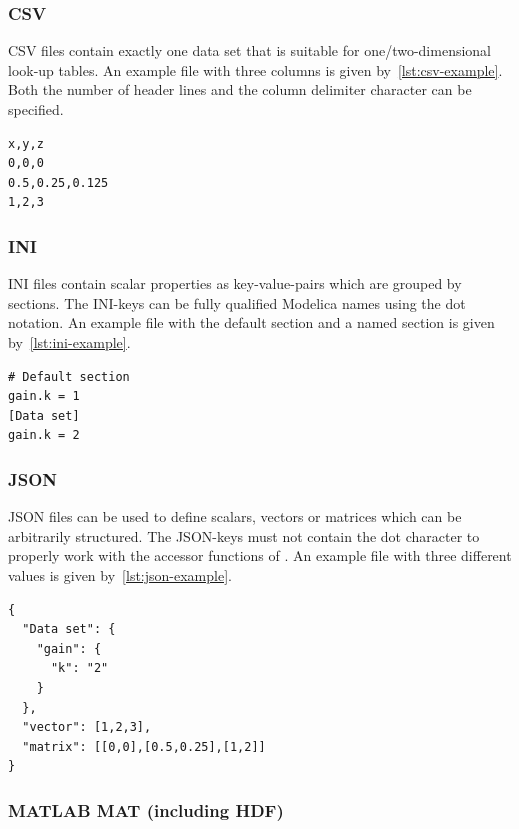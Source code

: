 \documentclass{modelica}
\newcommand{\modelica}[1]{\code{#1}}
\begin{document}
\subsubsection{CSV}

CSV files contain exactly one data set that is suitable for one/two-dimensional look-up tables.
An example file with three columns is given by~\autoref{lst:csv-example}.
Both the number of header lines and the column delimiter character can be specified.

\begin{lstlisting}[caption=Example CSV file, label=lst:csv-example]
x,y,z
0,0,0
0.5,0.25,0.125
1,2,3
\end{lstlisting}

\subsubsection{INI}

INI files contain scalar properties as key-value-pairs which are grouped by sections.
The INI-keys can be fully qualified Modelica names using the dot notation.
An example file with the default section and a named section is given by~\autoref{lst:ini-example}.

\begin{lstlisting}[caption=Example INI file, label=lst:ini-example]
# Default section
gain.k = 1
[Data set]
gain.k = 2
\end{lstlisting}

\subsubsection{JSON}

JSON files can be used to define scalars, vectors or matrices which can be arbitrarily structured.
The JSON-keys must not contain the dot character to properly work with the accessor functions of \modelica{ExternData}.
An example file with three different values is given by~\autoref{lst:json-example}.

\begin{lstlisting}[caption=Example JSON file, label=lst:json-example]
{
  "Data set": {
    "gain": {
      "k": "2"
    }
  },
  "vector": [1,2,3],
  "matrix": [[0,0],[0.5,0.25],[1,2]]
}
\end{lstlisting}

\subsubsection{MATLAB MAT (including HDF)}
\end{document}
